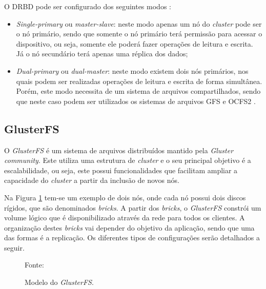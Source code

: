 O \ac{DRBD} pode ser configurado dos seguintes modos \cite{drbd}:
\begin{itemize}
 \item \textit{Single-primary} ou \textit{master-slave}: neste modo apenas um nó do \textit{cluster} pode ser o nó primário, sendo que somente
 o nó primário terá permissão para acessar o dispositivo, ou seja, somente ele poderá fazer operações de leitura e escrita. Já o nó 
 secundário terá apenas uma réplica dos dados;
 \item \textit{Dual-primary} ou \textit{dual-master}: neste modo existem dois nós primários, nos quais podem ser realizadas operações de leitura e 
 escrita de forma simultânea. Porém, este modo necessita de um sistema de arquivos compartilhados, sendo que neste caso podem ser utilizados os
 sistemas de arquivos \ac{GFS} \cite{gfs} e \ac{OCFS2} \cite{ocfs2}.
\end{itemize}

\subsection{GlusterFS}
\label{section:glusterfs}
O \textit{GlusterFS} \cite{glusterfs} é um sistema de arquivos distribuídos mantido pela \textit{Gluster community}. Este utiliza uma estrutura 
de \textit{cluster} e o seu principal objetivo é a escalabilidade, ou seja, este possui funcionalidades que facilitam ampliar a capacidade 
do \textit{cluster} a partir da inclusão de novos nós.

Na Figura \ref{fig:glusterfs} tem-se um exemplo de dois nós, onde cada nó possui dois discos rígidos, que são denominados \textit{bricks}. 
A partir dos \textit{bricks}, o \textit{GlusterFS} constrói um volume lógico que é disponibilizado através da rede para todos os clientes. 
A organização destes \textit{bricks} vai depender do objetivo da aplicação, sendo que uma das formas é a replicação. 
Os diferentes tipos de configurações serão detalhados a seguir.

\begin{figure}[h!]
 \centering
 \caption{Modelo do \textit{GlusterFS}.}
 Fonte: \citet{davies2013}
 \label{fig:glusterfs}
\end{figure}

